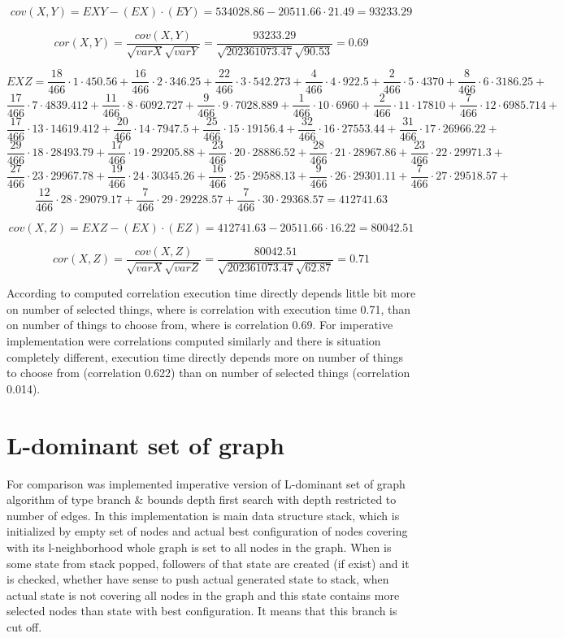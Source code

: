 \documentclass[11pt,twoside,a4paper]{book}
\begin{document}
$$cov\left(X,Y\right)=EXY-\left(EX\right)\cdot \left(EY\right)=534028.86
-20511.66\cdot 21.49= 93233.29$$

$$cor(X,Y)=\frac{cov(X,Y)}{\sqrt{varX}\sqrt{varY}}=\frac{93233.29}{\sqrt{202361073.47}\sqrt{90.53}}=0.69$$

$$EXZ=\frac{18}{466}\cdot 1\cdot450.56 + \frac{16}{466}\cdot 2\cdot346.25 +
\frac{22}{466}\cdot 3\cdot542.273+ \frac{4}{466}\cdot4\cdot922.5 +
\frac{2}{466}\cdot5\cdot4370 + \frac{8}{466}\cdot6\cdot3186.25 +
$$
$$\frac{17}{466}\cdot7\cdot4839.412+\frac{11}{466}\cdot8\cdot6092.727+\frac{9}{466}\cdot9\cdot7028.889+\frac{1}{466}\cdot10\cdot6960+\frac{2}{466}\cdot11\cdot17810+\frac{7}{466}\cdot12\cdot6985.714+$$
$$\frac{17}{466}\cdot13\cdot14619.412+\frac{20}{466}\cdot14\cdot7947.5+\frac{25}{466}\cdot15\cdot19156.4+\frac{32}{466}\cdot16\cdot27553.44+\frac{31}{466}\cdot17\cdot26966.22+$$
$$\frac{29}{466}\cdot18\cdot28493.79+\frac{17}{466}\cdot19\cdot29205.88+\frac{23}{466}\cdot20\cdot28886.52+\frac{28}{466}\cdot21\cdot28967.86+\frac{23}{466}\cdot22\cdot29971.3+$$
$$\frac{27}{466}\cdot23\cdot29967.78+\frac{19}{466}\cdot24\cdot30345.26+\frac{16}{466}\cdot25\cdot29588.13+\frac{9}{466}\cdot26\cdot29301.11+\frac{7}{466}\cdot27\cdot29518.57+$$
$$\frac{12}{466}\cdot28\cdot29079.17+\frac{7}{466}\cdot29\cdot29228.57+\frac{7}{466}\cdot30\cdot29368.57=412741.63$$

$$cov\left(X,Z\right)=EXZ-\left(EX\right)\cdot \left(EZ\right)=412741.63
-20511.66\cdot 16.22=80042.51$$

$$cor(X,Z)=\frac{cov(X,Z)}{\sqrt{varX}\sqrt{varZ}}=\frac{80042.51}{\sqrt{202361073.47}\sqrt{62.87}}=0.71$$

According to computed correlation execution time directly depends little bit
more on number of selected things, where is correlation with execution time
0.71, than on number of things to choose from, where is correlation 0.69. For
imperative implementation were correlations computed similarly and there is
situation completely different, execution time directly depends more on number
of things to choose from (correlation 0.622) than on number of selected things
(correlation 0.014).
\section{L-dominant set of graph}
\label{sec:ldsgComp}
For comparison was implemented imperative version of L-dominant set of graph
algorithm of type branch \& bounds depth first search with depth restricted to
number of edges. In this implementation is main data structure stack, which is
initialized by empty set of nodes and actual best configuration of nodes
covering with its l-neighborhood whole graph is set to all nodes in the graph.
When is some state from stack popped, followers of that state are created (if
exist) and it is checked, whether have sense to push actual generated state to
stack, when actual state is not covering all nodes in the graph and this state
contains more selected nodes than state with best configuration. It means that
this branch is cut off.
\end{document}
